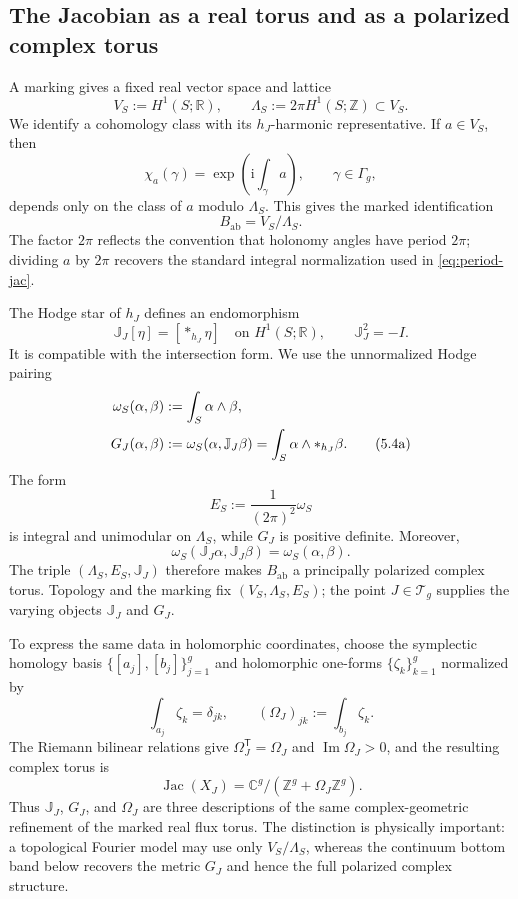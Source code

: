 \documentclass[11pt]{article}
\theoremstyle{definition}
\theoremstyle{remark}
\newcommand{\CC}{\mathbb C}
\newcommand{\RR}{\mathbb R}
\newcommand{\ZZ}{\mathbb Z}
\newcommand{\Jac}{\operatorname{Jac}}
\newcommand{\cT}{\mathcal T}
\newcommand{\ii}{\mathrm i}
\begin{document}
\subsection{The Jacobian as a real torus and as a polarized complex torus}

A marking gives a fixed real vector space and lattice
\[
       V_S:=H^1(S;\RR),\qquad
       \Lambda_S:=2\pi H^1(S;\ZZ)\subset V_S.
\]
We identify a cohomology class with its \(h_J\)-harmonic representative.  If
\(a\in V_S\), then
\[
       \chi_a(\gamma)
          =\exp\!\left(\ii\int_\gamma a\right),
          \qquad \gamma\in\Gamma_g,
\]
depends only on the class of \(a\) modulo \(\Lambda_S\).  This gives the
marked identification
\[
                  B_{\mathrm{ab}}=V_S/\Lambda_S.
\]
The factor \(2\pi\) reflects the convention that holonomy angles have period
\(2\pi\); dividing \(a\) by \(2\pi\) recovers the standard integral
normalization used in \eqref{eq:period-jac}.

The Hodge star of \(h_J\) defines an endomorphism
\[
             \mathbb J_J[\eta]=[*_{h_J}\eta]
             \quad\text{on }H^1(S;\RR),
             \qquad \mathbb J_J^2=-I.
             \tag{5.4}\label{eq:hodge-complex}
\]
It is compatible with the intersection form.  We use the unnormalized Hodge
pairing
\begin{align}
 \omega_S(\alpha,\beta)
    &:=\int_S\alpha\wedge\beta,\notag\\
 G_J(\alpha,\beta)
    &:=\omega_S(\alpha,\mathbb J_J\beta)
      =\int_S\alpha\wedge *_{h_J}\beta .
 \tag{5.4a}\label{eq:hodge-polarization-data}
\end{align}
The form
\[
                E_S:=\frac{1}{(2\pi)^2}\omega_S
\]
is integral and unimodular on \(\Lambda_S\), while \(G_J\) is positive
definite.  Moreover,
\[
 \omega_S(\mathbb J_J\alpha,\mathbb J_J\beta)
       =\omega_S(\alpha,\beta).
\]
The triple \((\Lambda_S,E_S,\mathbb J_J)\) therefore makes
\(B_{\mathrm{ab}}\) a principally polarized complex torus.  Topology and the
marking fix \((V_S,\Lambda_S,E_S)\); the point \(J\in\cT_g\) supplies
the varying objects \(\mathbb J_J\) and \(G_J\).

To express the same data in holomorphic coordinates, choose the symplectic
homology basis \(\{[a_j],[b_j]\}_{j=1}^g\) and holomorphic one-forms
\(\{\zeta_k\}_{k=1}^g\) normalized by
\[
       \int_{a_j}\zeta_k=\delta_{jk},\qquad
       (\Omega_J)_{jk}:=\int_{b_j}\zeta_k .
       \tag{5.4b}\label{eq:period-matrix-definition}
\]
The Riemann bilinear relations give
\(\Omega_J^{\mathsf T}=\Omega_J\) and
\(\operatorname{Im}\Omega_J>0\), and the resulting complex torus is
\[
             \Jac(X_J)
                =\CC^g/(\ZZ^g+\Omega_J\ZZ^g).
\]
Thus \(\mathbb J_J\), \(G_J\), and \(\Omega_J\) are three descriptions of the
same complex-geometric refinement of the marked real flux torus.  The
distinction is physically important: a topological Fourier model may use
only \(V_S/\Lambda_S\), whereas the continuum bottom band below recovers the
metric \(G_J\) and hence the full polarized complex structure.
\end{document}
